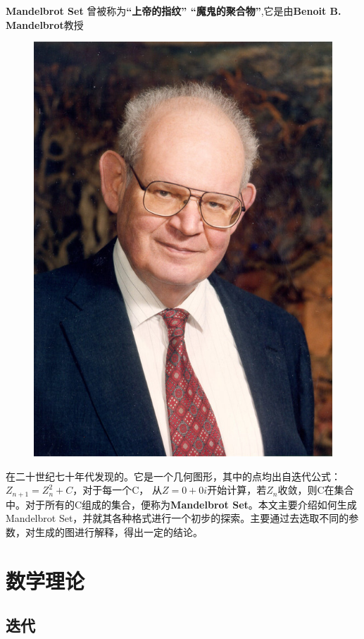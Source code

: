\documentclass{ctexart}
\begin{document}
{\bf Mandelbrot Set} \cite{1998The} 曾被称为{\bf ``上帝的指纹'' ``魔鬼的聚合物''},它是由{\bf Benoit B. Mandelbrot}教授
\begin{figure}[H]
\centering
\includegraphics[scale=0.1]{mandelbrot.jpeg}
\end{figure}
在二十世纪七十年代发现的。它是一个几何图形，其中的点均出自迭代公式：{\bf $Z_{n+1} = Z_n^2 + C$}，对于每一个C， 从$Z = 0 + 0i$开始计算，若$Z_n$收敛，则C在集合中。对于所有的C组成的集合，便称为{\bf Mandelbrot Set}。本文主要介绍如何生成 Mandelbrot Set，并就其各种格式进行一个初步的探索。主要通过去选取不同的参数，对生成的图进行解释，得出一定的结论。


\section{数学理论}
\subsection{迭代}
\end{document}
